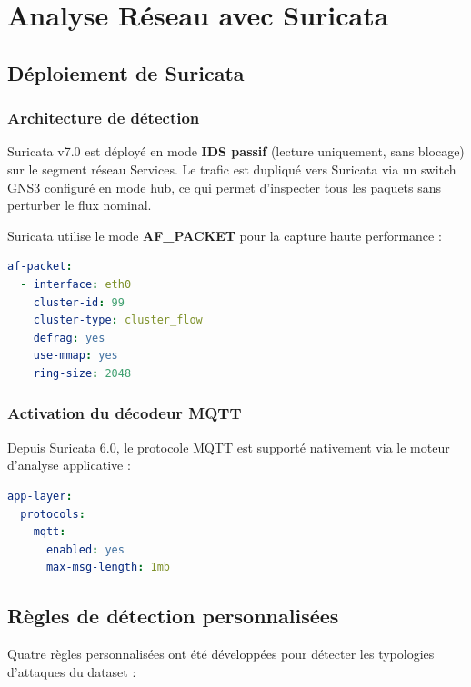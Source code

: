 \chapter{Analyse Réseau avec Suricata}

\section{Déploiement de Suricata}

\subsection{Architecture de détection}

Suricata v7.0 est déployé en mode \textbf{IDS passif} (lecture uniquement, sans blocage) sur le segment réseau Services. Le trafic est dupliqué vers Suricata via un switch GNS3 configuré en mode hub, ce qui permet d'inspecter tous les paquets sans perturber le flux nominal.

Suricata utilise le mode \textbf{AF\_PACKET} pour la capture haute performance :

\begin{lstlisting}[language=yaml, caption=Configuration AF\_PACKET dans suricata.yaml]
af-packet:
  - interface: eth0
    cluster-id: 99
    cluster-type: cluster_flow
    defrag: yes
    use-mmap: yes
    ring-size: 2048
\end{lstlisting}

\subsection{Activation du décodeur MQTT}

Depuis Suricata 6.0, le protocole MQTT est supporté nativement via le moteur d'analyse applicative :

\begin{lstlisting}[language=yaml, caption=Activation du parseur MQTT dans suricata.yaml]
app-layer:
  protocols:
    mqtt:
      enabled: yes
      max-msg-length: 1mb
\end{lstlisting}

\section{Règles de détection personnalisées}

Quatre règles personnalisées ont été développées pour détecter les typologies d'attaques du dataset :

